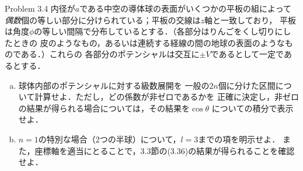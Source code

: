   \clearpage
  \begin{bx1}{Problem 3.4}
    内径が$a$である中空の導体球の表面がいくつかの平板の組によって
    \emph{偶数}個の等しい部分に分けられている；平板の交線は$z$軸と一致しており，
    平板は角度$\phi$の等しい間隔で分布しているとする．（各部分はりんごをくし切りにしたときの
    皮のようなもの，あるいは連続する経線の間の地球の表面のようなものである．）これらの
    各部分のポテンシャルは交互に$\pm V$であるとして一定であるとする．
    \begin{enumerate}[(a)]%
      \item 球体内部のポテンシャルに対する級数展開を
        一般の$2n$個に分けた区間について計算せよ．ただし，どの係数が非ゼロであるかを
        正確に決定し，非ゼロの結果が得られる場合については，その結果を$\cos\theta$
        についての積分で表示せよ．
      \item $n = 1$の特別な場合（2つの半球）について，$l = 3$までの項を明示せよ．
        また，座標軸を適当にとることで，3.3節の(3.36)の結果が得られることを確認せよ．
    \end{enumerate}%
  \end{bx1}

